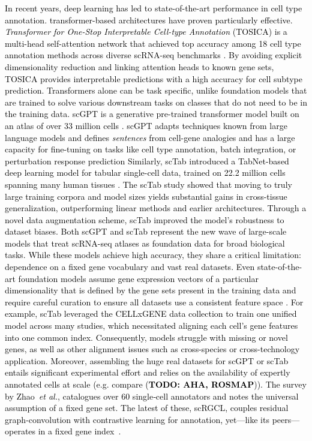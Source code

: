 \documentclass{article}
\newcommand{\gpt}[1]{\textcolor{black}{#1}}
\begin{document}

\gpt{In recent years, deep learning has led to state-of-the-art performance in cell type annotation. transformer-based architectures have proven particularly effective. \textit{Transformer for One-Stop Interpretable Cell-type Annotation} (TOSICA) is a multi-head self-attention network that achieved top accuracy among 18 cell type annotation methods across diverse scRNA-seq benchmarks \cite{chen2023transformer}. By avoiding explicit dimensionality reduction and linking attention heads to known gene sets, TOSICA provides interpretable predictions with a high accuracy for cell subtype prediction. 
Transformers alone can be task specific, unlike foundation models that are trained to solve various downstream tasks on classes that do not need to be in the training data. 
scGPT is a generative pre-trained transformer model built on an atlas of over 33 million cells \cite{cui2024scgpt}. scGPT adapts techniques known from large language models and defines \textit{sentences} from cell-gene analogies and has a large capacity for fine-tuning on tasks like cell type annotation, batch integration, or perturbation response prediction
Similarly, scTab introduced a TabNet-based deep learning model for tabular single-cell data, trained on 22.2 million cells spanning many human tissues \cite{fischer2024sctab}. The scTab study showed that moving to truly large training corpora and model sizes yields substantial gains in cross-tissue generalization, outperforming linear methods and earlier architectures. Through a novel data augmentation scheme, scTab improved the model’s robustness to dataset biases. Both scGPT and scTab represent the new wave of large-scale models that treat scRNA-seq atlases as foundation data for broad biological tasks. While these models achieve high accuracy, they share a critical limitation: dependence on a fixed gene vocabulary and vast real datasets. Even state-of-the-art foundation models assume gene expression vectors of a particular dimensionality that is defined by the gene sets present in the training data and require careful curation to ensure all datasets use a consistent feature space \cite{fischer2024sctab}. For example, scTab leveraged the CELLxGENE data collection to train one unified model across many studies, which necessitated aligning each cell’s gene features into one common index. Consequently, models struggle with missing or novel genes, as well as other alignment issues such as cross-species or cross-technology application. Moreover, assembling the huge real datasets for scGPT or scTab entails significant experimental effort and relies on the availability of expertly annotated cells at scale (e.g. compare \cite{flotho2024zebra, grandke2025single} (\textbf{TODO: AHA, ROSMAP})). The survey by Zhao \textit{et al.},\cite{zhao2023survey} catalogues over 60 single‑cell annotators and notes the universal assumption of a fixed gene set. The latest of these, scRGCL, couples residual graph‑convolution with contrastive learning for annotation, yet—like its peers—operates in a fixed gene index \cite{yuan2025scrgcl}.}
\end{document}
